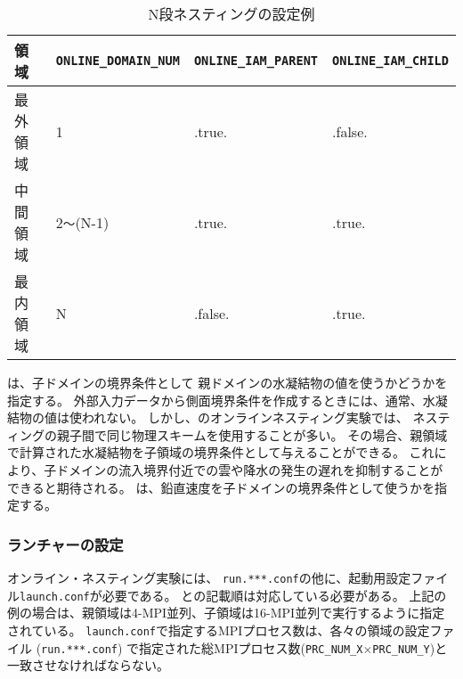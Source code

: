 \begin{table}[htb]
\begin{center}
\caption{N段ネスティングの設定例}
\begin{tabularx}{150mm}{|l|l|l|X|} \hline
 \rowcolor[gray]{0.9} 領域 & \verb|ONLINE_DOMAIN_NUM| & \verb|ONLINE_IAM_PARENT| & \verb|ONLINE_IAM_CHILD|\\ \hline
 最外領域 & 1               & .true.  & .false. \\ \hline
 中間領域 & 2\verb|〜|(N-1) & .true.  & .true. \\ \hline
 最内領域 & N               & .false. & .true. \\ \hline
\end{tabularx}
\label{tab:triple_nested}
\end{center}
\end{table}

は、子ドメインの境界条件として
親ドメインの水凝結物の値を使うかどうかを指定する。
外部入力データから側面境界条件を作成するときには、通常、水凝結物の値は使われない。
しかし、\scalerm のオンラインネスティング実験では、
ネスティングの親子間で同じ物理スキームを使用することが多い。
その場合、親領域で計算された水凝結物を子領域の境界条件として与えることができる。
これにより、子ドメインの流入境界付近での雲や降水の発生の遅れを抑制することが
できると期待される。
は、鉛直速度を子ドメインの境界条件として使うかを指定する。


\subsubsection{ランチャーの設定}
\label{subsubsec:launch}
オンライン・ネスティング実験には、
\verb|run.***.conf|の他に、起動用設定ファイル\verb|launch.conf|が必要である。
との記載順は対応している必要がある。
上記の例の場合は、親領域は4-MPI並列、子領域は16-MPI並列で実行するように指定されている。
\verb|launch.conf|で指定するMPIプロセス数は、各々の領域の設定ファイル (\verb|run.***.conf|)
で指定された総MPIプロセス数(\verb|PRC_NUM_X|$\times$\verb|PRC_NUM_Y|)と一致させなければならない。


